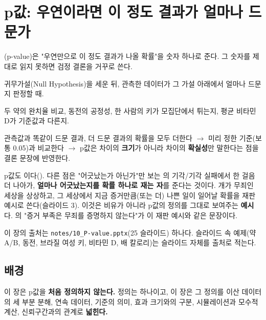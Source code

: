 \chapter{p값: 우연이라면 이 정도 결과가 얼마나 드문가}
\label{ch:pvalue}

\begin{inbrief}
  \item[Why] (p-value)은 "우연만으로 이 정도 결과가 나올 확률"을
             숫자 하나로 준다. 그 숫자를 제대로 읽지 못하면 검정 결론을
             거꾸로 쓴다.
  \item[When] 귀무가설(Null Hypothesis)을 세운 뒤, 관측한 데이터가 그
              가설 아래에서 얼마나 드문지 판정할 때.
  \item[Where] 두 약의 완치율 비교, 동전의 공정성, 한 사람의 키가
               모집단에서 튀는지, 평균 비타민 D가 기준값과 다른지.
  \item[How] 관측값과 똑같이 드문 결과, 더 드문 결과의 확률을 모두 더한다
             $\to$ 미리 정한 기준(보통 0.05)과 비교한다 $\to$ p값은 차이의
             \textbf{크기}가 아니라 차이의 \textbf{확실성}만 말한다는 점을
             결론 문장에 반영한다.
\end{inbrief}

\begin{keyidea}
p값도 이다(). 다른 점은
"어긋났는가 아닌가"만 보는 의 기각/기각 실패에서 한 걸음
더 나아가, \textbf{얼마나 어긋났는지를 확률 하나로 재는 자}를 준다는
것이다. 개가 무죄인 세상을 상상하고, 그 세상에서 지금 증거만큼(또는 더)
나쁜 일이 일어날 확률을 재판 예시로 쓴다(슬라이드 3). 이것은 비유가 아니라
p값의 정의를 그대로 보여주는 \textbf{예시}다. 의
"증거 부족은 무죄를 증명하지 않는다"가 이 재판 예시와 같은 문장이다.
\end{keyidea}

이 장의 출처는 \texttt{notes/10\_P-value.pptx}(25 슬라이드) 하나다. 슬라이드
속 예제(약 A/B, 동전, 브라질 여성 키, 비타민 D, 배 칼로리)는 슬라이드 자체를
출처로 적는다.

\section{배경}
\label{sec:pv-background}

이 장은 p값을 \textbf{처음 정의하지 않는다.} 정의는 
하나이고, 이 장은 그 정의를 이산 데이터의 세 부분 분해, 연속 데이터, 기준의
의미, 효과 크기와의 구분, 시뮬레이션과 모수적 계산, 신뢰구간과의 관계로
\textbf{넓힌다.}

